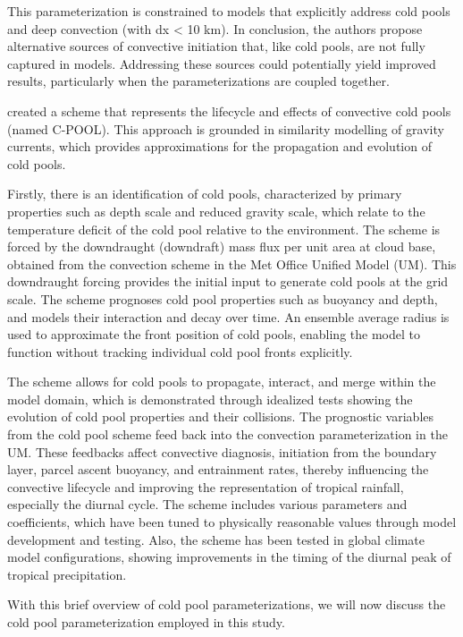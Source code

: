 This parameterization is constrained to models that explicitly address cold pools and deep convection (with dx < 10 km). In conclusion, the authors propose alternative sources of convective initiation that, like cold pools, are not fully captured in models. Addressing these sources could potentially yield improved results, particularly when the parameterizations are coupled together.

 created a scheme that represents the lifecycle and effects of convective cold pools (named C-POOL). This approach is grounded in similarity modelling of gravity currents, which provides approximations for the propagation and evolution of cold pools.

Firstly, there is an identification of cold pools, characterized by primary properties such as depth scale and reduced gravity scale, which relate to the temperature deficit of the cold pool relative to the environment. The scheme is forced by the downdraught (downdraft) mass flux per unit area at cloud base, obtained from the convection scheme in the Met Office Unified Model (UM). This downdraught forcing provides the initial input to generate cold pools at the grid scale. The scheme prognoses cold pool properties such as buoyancy and depth, and models their interaction and decay over time. An ensemble average radius is used to approximate the front position of cold pools, enabling the model to function without tracking individual cold pool fronts explicitly. 

The scheme allows for cold pools to propagate, interact, and merge within the model domain, which is demonstrated through idealized tests showing the evolution of cold pool properties and their collisions. The prognostic variables from the cold pool scheme feed back into the convection parameterization in the UM. These feedbacks affect convective diagnosis, initiation from the boundary layer, parcel ascent buoyancy, and entrainment rates, thereby influencing the convective lifecycle and improving the representation of tropical rainfall, especially the diurnal cycle. The scheme includes various parameters and coefficients, which have been tuned to physically reasonable values through model development and testing. Also, the scheme has been tested in global climate model configurations, showing improvements in the timing of the diurnal peak of tropical precipitation.

With this brief overview of cold pool parameterizations, we will now discuss the cold pool parameterization employed in this study.

